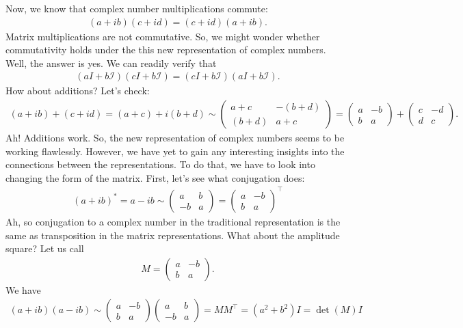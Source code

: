 \documentclass{article}
\theoremstyle{definition}
\begin{document}
Now, we know that complex number multiplications commute:
\begin{align*}
(a+ib)(c+id) = (c+id)(a+ib).
\end{align*}
Matrix multiplications are not commutative. So, we might wonder whether commutativity holds under the this new representation of complex numbers. Well, the answer is yes. We can readily verify that
\begin{align*}
(aI+b\mathcal{I})(cI+b\mathcal{I}) = (cI+b\mathcal{I})(aI+b\mathcal{I}).
\end{align*}
How about additions? Let's check:
\begin{align*}
(a + ib) + (c+ id) = (a+c) + i(b+d) \sim \begin{pmatrix}
a+c & -(b+d)\\
(b+d) & a+c 
\end{pmatrix}=
\begin{pmatrix}
a & -b\\
b & a
\end{pmatrix}+
\begin{pmatrix}
c & -d\\
d & c
\end{pmatrix}.
\end{align*}
Ah! Additions work. So, the new representation of complex numbers seems to be working flawlessly. However, we have yet to gain any interesting insights into the connections between the representations. To do that, we have to look into changing the form of the matrix. First, let's see what conjugation does:
\begin{align*}
(a+ib)^* = a-ib \sim \begin{pmatrix}
a & b \\
-b & a
\end{pmatrix}
=
\begin{pmatrix}
a & -b\\
b & a
\end{pmatrix}^{\top}
\end{align*}
Ah, so conjugation to a complex number in the traditional representation is the same as transposition in the matrix representations. What about the amplitude square? Let us call 
\begin{align*}
M = \begin{pmatrix}
a & -b \\
b & a
\end{pmatrix}.
\end{align*}
We have
\begin{align*}
(a+ib)(a-ib) \sim \begin{pmatrix}
a & -b\\
b & a
\end{pmatrix}
\begin{pmatrix}
a & b \\
-b & a
\end{pmatrix} =
MM^\top= (a^2+b^2)I = \det(M)I
\end{align*}
\end{document}
